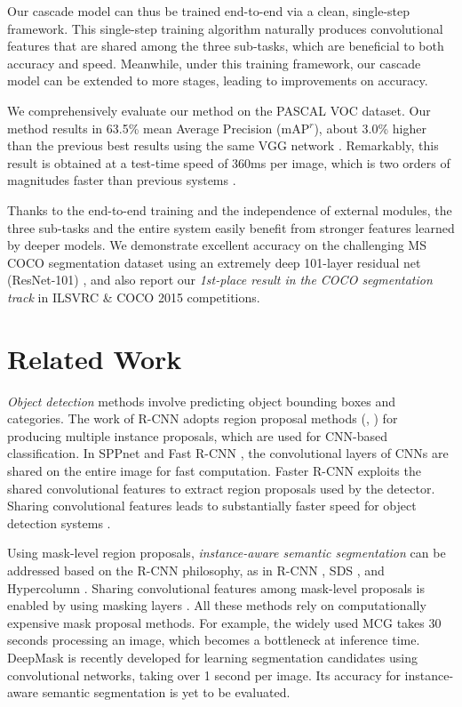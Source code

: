 \documentclass[10pt,twocolumn,letterpaper]{article}
\begin{document}
Our cascade model can thus be trained end-to-end via a clean, single-step framework. This single-step training algorithm naturally produces convolutional features that are shared among the three sub-tasks, which are beneficial to both accuracy and speed. Meanwhile, under this training framework, our cascade model can be extended to more stages, leading to improvements on accuracy.

We comprehensively evaluate our method on the PASCAL VOC dataset. Our method results in 63.5\% mean Average Precision (mAP$^r$), about 3.0\% higher than the previous best results \cite{Hariharan2015,Dai2015} using the same VGG network \cite{Simonyan2015}. Remarkably, this result is obtained at a test-time speed of 360ms per image, which is two orders of magnitudes faster than previous systems \cite{Hariharan2015,Dai2015}.

Thanks to the end-to-end training and the independence of external modules, the three sub-tasks and the entire system easily benefit from stronger features learned by deeper models. We demonstrate excellent accuracy on the challenging MS COCO segmentation dataset using an extremely deep 101-layer residual net (ResNet-101) \cite{He2015a}, and also report our \emph{1st-place result in the COCO segmentation track} in ILSVRC \& COCO 2015 competitions.


\section{Related Work}

\emph{Object detection} methods \cite{Girshick2014,He2014,Girshick2015,Ren2015} involve predicting object bounding boxes and categories. The work of R-CNN \cite{Girshick2014} adopts region proposal methods (\eg, \cite{Uijlings2013,Zitnick2014}) for producing multiple instance proposals, which are used for CNN-based classification. In SPPnet \cite{He2014} and Fast R-CNN \cite{Girshick2015}, the convolutional layers of CNNs are shared on the entire image for fast computation. Faster R-CNN \cite{Ren2015} exploits the shared convolutional features to extract region proposals used by the detector. Sharing convolutional features leads to substantially faster speed for object detection systems \cite{He2014,Girshick2015,Ren2015}.

Using mask-level region proposals, \emph{instance-aware semantic segmentation} can be addressed based on the R-CNN philosophy, as in R-CNN \cite{Girshick2014}, SDS \cite{Hariharan2014}, and Hypercolumn \cite{Hariharan2015}. Sharing convolutional features among mask-level proposals is enabled by using masking layers \cite{Dai2015}. All these methods \cite{Girshick2014,Hariharan2014,Hariharan2015,Dai2015} rely on computationally expensive mask proposal methods. For example, the widely used MCG \cite{Arbelaez2014} takes 30 seconds processing an image, which becomes a bottleneck at inference time. DeepMask \cite{Pinheiro2015} is recently developed for learning segmentation candidates using convolutional networks, taking over 1 second per image. Its accuracy for instance-aware semantic segmentation is yet to be evaluated.
\end{document}
